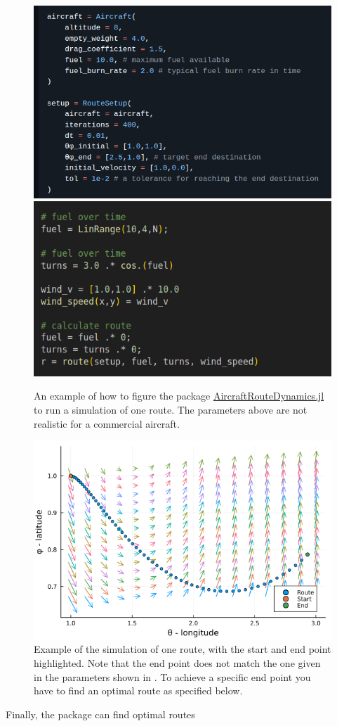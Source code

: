 \documentclass{article}
\begin{document}
\begin{figure}[h]
    \centering
    \includegraphics[width = 0.47\linewidth]{../imgs/configure-aircraft.png}
    \includegraphics[width = 0.37\linewidth]{../imgs/run-aircraft.png}
    \caption{An example of how to figure the package \href{https://github.com/arturgower/AircraftRouteDynamics.jl/tree/main}{AircraftRouteDynamics.jl} to run a simulation of one route. The parameters above are not realistic for a commercial aircraft.}
    \label{fig:configure-aircraft}
\end{figure}

\begin{figure}[h]
    \centering
    \includegraphics[width = 0.6\linewidth]{../imgs/readme-1.png}
    \caption{Example of the simulation of one route, with the start and end point highlighted. Note that the end point does not match the one given in the parameters shown in . To achieve a specific end point you have to find an optimal route as specified below.}
    \label{fig:one-route}
\end{figure}

Finally, the package can find optimal routes
\end{document}
